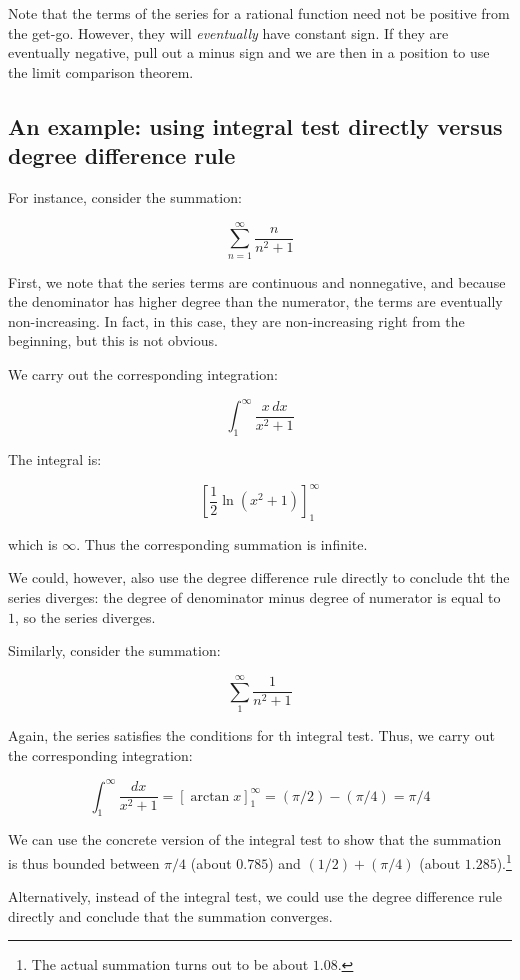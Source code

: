 \documentclass{amsart}
\begin{document}
Note that the terms of the series for a rational function need not be
positive from the get-go. However, they will {\em eventually} have
constant sign. If they are eventually negative, pull out a minus sign
and we are then in a position to use the limit comparison theorem.

\subsection{An example: using integral test directly versus degree difference rule}
 
For instance, consider the summation:

$$\sum_{n=1}^\infty \frac{n}{n^2 + 1}$$

First, we note that the series terms are continuous and nonnegative,
and because the denominator has higher degree than the numerator, the
terms are eventually non-increasing. In fact, in this case, they are
non-increasing right from the beginning, but this is not obvious.

We carry out the corresponding integration:

$$\int_1^\infty \frac{x \, dx}{x^2 + 1}$$

The integral is:

$$\left[\frac{1}{2}\ln(x^2 + 1)\right]_1^\infty$$

which is $\infty$. Thus the corresponding summation is infinite.

We could, however, also use the degree difference rule directly to
conclude tht the series diverges: the degree of denominator minus
degree of numerator is equal to $1$, so the series diverges.

Similarly, consider the summation:

$$\sum_1^\infty \frac{1}{n^2 + 1}$$

Again, the series satisfies the conditions for th integral test. Thus,
we carry out the corresponding integration:

$$\int_1^\infty \frac{dx}{x^2 + 1} = [\arctan x]_1^\infty = (\pi/2) - (\pi/4) = \pi/4$$

We can use the concrete version of the integral test to show that the
summation is thus bounded between $\pi/4$ (about $0.785$) and $(1/2) +
(\pi/4)$ (about $1.285$).\footnote{The actual summation turns out to
be about $1.08$.}

Alternatively, instead of the integral test, we could use the degree
difference rule directly and conclude that the summation converges.
\end{document}
